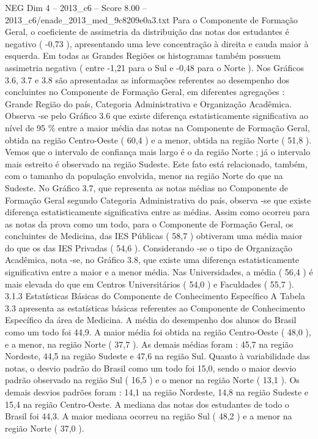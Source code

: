 \begin{textsample}{NEG Dim 4 – 2013\_c6 – Score 8.00 – 2013\_c6/enade\_2013\_med\_9c8209e0a3.txt}
Para o Componente de Formação Geral, o coeficiente de assimetria da distribuição das notas dos estudantes é negativo ( -0,73 ), apresentando uma leve concentração à direita e cauda maior à esquerda.
Em todas as Grandes Regiões os histogramas também possuem assimetria negativa ( entre -1,21 para o Sul e -0,48 para o Norte ).
Nos Gráficos 3.6, 3.7 e 3.8 são apresentadas as informações referentes ao desempenho dos concluintes no Componente de Formação Geral, em diferentes agregações : Grande Região do país, Categoria Administrativa e Organização Acadêmica.
Observa -se pelo Gráfico 3.6 que existe diferença estatisticamente significativa ao nível de 95 \% entre a maior média das notas na Componente de Formação Geral, obtida na região Centro-Oeste ( 60,4 ) e a menor, obtida na região Norte ( 51,8 ).
Vemos que o intervalo de confiança mais largo é o da região Norte ; já o intervalo mais estreito é observado na região Sudeste.
Este fato está relacionado, também, com o tamanho da população envolvida, menor na região Norte do que na Sudeste.
No Gráfico 3.7, que representa as notas médias no Componente de Formação Geral segundo Categoria Administrativa do país, observa -se que existe diferença estatisticamente significativa entre as médias.
Assim como ocorreu para as notas da prova como um todo, para o Componente de Formação Geral, os concluintes de Medicina, das IES Públicas ( 58,7 ) obtiveram uma média maior do que os das IES Privadas ( 54,6 ).
Considerando -se o tipo de Organização Acadêmica, nota -se, no Gráfico 3.8, que existe uma diferença estatisticamente significativa entre a maior e a menor média.
Nas Universidades, a média ( 56,4 ) é mais elevada do que em Centros Universitários ( 54,0 ) e Faculdades ( 55,7 ). 3.1.3 Estatísticas Básicas do Componente de Conhecimento Específico A Tabela 3.3 apresenta as estatísticas básicas referentes ao Componente de Conhecimento Específico da área de Medicina.
A média do desempenho dos alunos do Brasil como um todo foi 44,9.
A maior média foi obtida na região Centro-Oeste ( 48,0 ), e a menor, na região Norte ( 37,7 ).
As demais médias foram : 45,7 na região Nordeste, 44,5 na região Sudeste e 47,6 na região Sul.
Quanto à variabilidade das notas, o desvio padrão do Brasil como um todo foi 15,0, sendo o maior desvio padrão observado na região Sul ( 16,5 ) e o menor na região Norte ( 13,1 ).
Os demais desvios padrões foram : 14,1 na região Nordeste, 14,8 na região Sudeste e 15,4 na região Centro-Oeste.
A mediana das notas dos estudantes de todo o Brasil foi 44,3.
A maior mediana ocorreu na região Sul ( 48,2 ) e a menor na região Norte ( 37,0 ).

\end{textsample}
